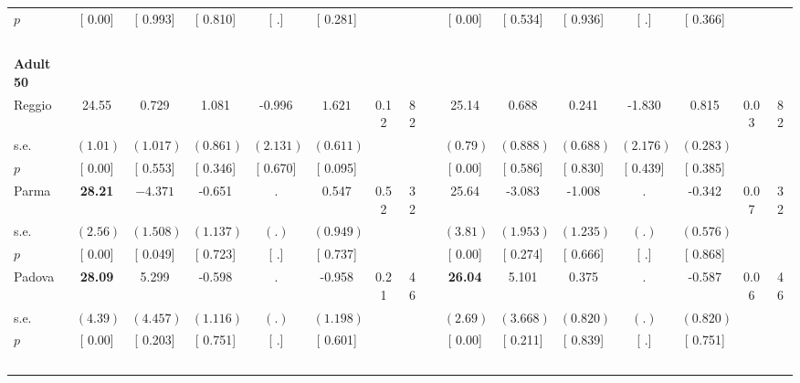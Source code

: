 \begin{longtable}{L{8em} c c c c c c c p{1em} c c c c c c c}
\quad \quad \quad \quad $ p$ & [     0.00] & [    0.993] & [    0.810] & [        .] & [    0.281] & & & & [     0.00] & [    0.534] & [    0.936] & [        .] & [    0.366] & &  \\[1em]
~\\[1em]
\quad \quad \textbf{Adult 50} & & & & & & & & & & & & & & & \\* 
\quad \quad \quad Reggio& 24.55 &     0.729 &     1.081 &    -0.996 & $ \mathbf{    1.621}$ &      0.12 &        82 & & 25.14 &     0.688 &     0.241 &    -1.830 &     0.815 &      0.03 &        82  \\*
\quad \quad \quad \quad s.e.& $ (     1.01)$ & $ (    1.017)$ & $ (    0.861)$ & $ (    2.131)$ & $ (    0.611)$ & & & & $ (     0.79)$ & $ (    0.888)$ & $ (    0.688)$ & $ (    2.176)$ & $ (    0.283)$ & &  \\*
\quad \quad \quad \quad $ p$ & [     0.00] & [    0.553] & [    0.346] & [    0.670] & [    0.095] & & & & [     0.00] & [    0.586] & [    0.830] & [    0.439] & [    0.385] & &  \\[1em]
\quad \quad \quad Parma& \textbf{    28.21} & $ \mathbf{   -4.371}$ &    -0.651 &         . &     0.547 &      0.52 &        32 & & 25.64 &    -3.083 &    -1.008 &         . &    -0.342 &      0.07 &        32  \\*
\quad \quad \quad \quad s.e.& $ (     2.56)$ & $ (    1.508)$ & $ (    1.137)$ & $ (        .)$ & $ (    0.949)$ & & & & $ (     3.81)$ & $ (    1.953)$ & $ (    1.235)$ & $ (        .)$ & $ (    0.576)$ & &  \\*
\quad \quad \quad \quad $ p$ & [     0.00] & [    0.049] & [    0.723] & [        .] & [    0.737] & & & & [     0.00] & [    0.274] & [    0.666] & [        .] & [    0.868] & &  \\[1em]
\quad \quad \quad Padova& \textbf{    28.09} &     5.299 &    -0.598 &         . &    -0.958 &      0.21 &        46 & & \textbf{    26.04} &     5.101 &     0.375 &         . &    -0.587 &      0.06 &        46  \\*
\quad \quad \quad \quad s.e.& $ (     4.39)$ & $ (    4.457)$ & $ (    1.116)$ & $ (        .)$ & $ (    1.198)$ & & & & $ (     2.69)$ & $ (    3.668)$ & $ (    0.820)$ & $ (        .)$ & $ (    0.820)$ & &  \\*
\quad \quad \quad \quad $ p$ & [     0.00] & [    0.203] & [    0.751] & [        .] & [    0.601] & & & & [     0.00] & [    0.211] & [    0.839] & [        .] & [    0.751] & &  \\[1em]
~\\[1em]

\end{longtable}
